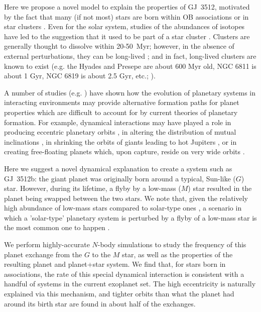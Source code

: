 \documentclass[twocolumn]{aastex62}
\begin{document}
Here we propose a novel model to explain the properties of GJ~3512,
motivated by the fact that many (if not most) stars are born within
OB associations or in star clusters \citep{Clarke2000,
Lada2003}. Even for the solar system, studies of the abundances of isotopes have
led to the suggestion that it used to be part of a star cluster \citep{Adams2001}.  Clusters are
generally thought to dissolve within 20-50~Myr; however, in the absence of external perturbations, they can be long-lived \citep{deGrijs2009}; and in fact, long-lived clusters are known
to exist (e.g.  the Hyades and Presepe are about 600 Myr old, NGC 6811 is about 1 Gyr, NGC 6819 is about 2.5 Gyr, etc.;  \citealt{Meibom2015,meibom18}).


A number of studies (e.g.  \citealt{Heggie1996,Laughlin1998, Davies2001,Bonnell2001,Thies2005,Olczak2010,Chatterjee2012,Portegies2015,
Cai2017,Cai2018,Rice2018,Cai2019,
vanelteren2019, Flammini2019,Kremer2019}) have shown how the evolution of planetary systems in
interacting environments may  provide alternative
formation paths for planet properties which are difficult to account for
by current theories of planetary formation. For example, dynamical
interactions may have played a role in producing 
eccentric planetary orbits \citep{DelaFuente1997}, in 
altering the distribution of mutual inclinations \citep{Boley2012}, in shrinking the orbits of giants leading
to hot Jupiters \citep{Shara2016,Hamers2017}, or in creating free-floating planets which, upon
capture, reside on very wide orbits \citep{Perets2012}.

Here we suggest a novel dynamical explanation to create a system such
as GJ~3512b: the giant planet was originally born around a typical,
Sun-like ($G$) star. However, during its lifetime, a flyby by a
low-mass ($M$) star resulted in the planet being swapped between the
two stars. 
We note that, given the relatively high abundance of low-mass stars compared to solar-type ones \citep{Scalo1979}, a scenario in which a 'solar-type' planetary system is perturbed by a flyby of a low-mass star is the most common one to happen \citep{leigh12,leigh15}.



We perform highly-accurate $N$-body simulations to study
the frequency of this planet exchange from the $G$ to the $M$ star, as
well as the properties of the resulting planet and planet+star system.
We find that, for stars born in associations, the rate of this special
dynamical interaction is consistent with a handful of systems in the
current exoplanet set. The high eccentricity is naturally explained
via this mechanism, and tighter orbits than what the planet had
around its birth star are found in about half of the exchanges.
\end{document}

